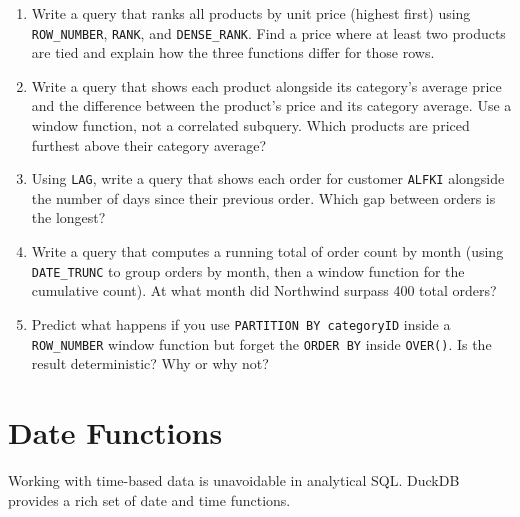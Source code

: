 \documentclass[
  letterpaper,
  DIV=11,
  numbers=noendperiod]{scrreprt}
\begin{document}
\begin{tcolorbox}[enhanced jigsaw, opacitybacktitle=0.6, arc=.35mm, colback=white, bottomtitle=1mm, opacityback=0, toprule=.15mm, left=2mm, colbacktitle=quarto-callout-note-color!10!white, breakable, coltitle=black, toptitle=1mm, colframe=quarto-callout-note-color-frame, bottomrule=.15mm, titlerule=0mm, title=\textcolor{quarto-callout-note-color}{\faInfo}\hspace{0.5em}{Exercises}, rightrule=.15mm, leftrule=.75mm]

\begin{enumerate}
\def\labelenumi{\arabic{enumi}.}
\item
  Write a query that ranks all products by unit price (highest first)
  using \texttt{ROW\_NUMBER}, \texttt{RANK}, and \texttt{DENSE\_RANK}.
  Find a price where at least two products are tied and explain how the
  three functions differ for those rows.
\item
  Write a query that shows each product alongside its category's average
  price and the difference between the product's price and its category
  average. Use a window function, not a correlated subquery. Which
  products are priced furthest above their category average?
\item
  Using \texttt{LAG}, write a query that shows each order for customer
  \texttt{\textquotesingle{}ALFKI\textquotesingle{}} alongside the
  number of days since their previous order. Which gap between orders is
  the longest?
\item
  Write a query that computes a running total of order count by month
  (using \texttt{DATE\_TRUNC} to group orders by month, then a window
  function for the cumulative count). At what month did Northwind
  surpass 400 total orders?
\item
  Predict what happens if you use \texttt{PARTITION\ BY\ categoryID}
  inside a \texttt{ROW\_NUMBER} window function but forget the
  \texttt{ORDER\ BY} inside \texttt{OVER()}. Is the result
  deterministic? Why or why not?
\end{enumerate}

\end{tcolorbox}

\section{Date Functions}\label{date-functions}

Working with time-based data is unavoidable in analytical SQL. DuckDB
provides a rich set of date and time functions.
\end{document}
